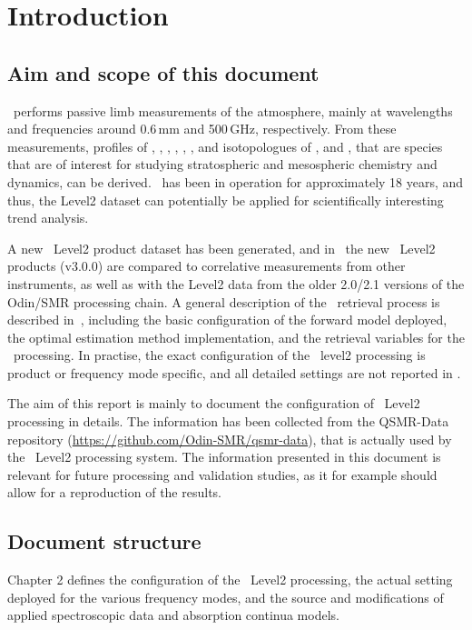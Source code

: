 \chapter{Introduction}
\label{chapter:introduction}


\setcounter{page}{1}


\section{Aim and scope of this document}
\label{sec:aim}
\smr\ performs passive limb measurements of the atmosphere,
mainly at wavelengths and frequencies around 0.6\,mm and 500\,GHz,
respectively.
From these measurements, profiles of 
, , , , 
, , and isotopologues of , and ,
that are species that are of interest for studying stratospheric and 
mesospheric chemistry and dynamics, can be derived. 
\smr\ has been in operation for approximately 18 years, and thus, the Level2
dataset can potentially be applied for scientifically interesting trend analysis.

A new \smr\ Level2 product dataset has been generated, and in~\cite{dds}
the new \smr\ Level2 products (v3.0.0) are compared to correlative measurements from other
instruments, as well as with the Level2 data from the older 2.0/2.1 versions of
the Odin/SMR processing chain. A general description
of the \smr\ retrieval process is described in~\cite{atbdl2}, including 
the basic configuration of the forward
model deployed, the optimal estimation method implementation, and the retrieval
variables for the \smr\ processing. In practise, the exact configuration
of the \smr\ level2 processing is product or frequency mode specific,
and all detailed settings are not reported in \cite{atbdl2}.

The aim of this report is mainly to document the configuration of \smr\ Level2 processing
in details. The information has been collected from the QSMR-Data repository
(\url{https://github.com/Odin-SMR/qsmr-data}), that is actually used
by the \smr\ Level2 processing system. 
The information presented in this document is relevant for future processing and 
validation studies,
as it for example should allow for a reproduction of the results.
 

\section{Document structure}

Chapter 2 defines the configuration of the \smr\ Level2
processing, the actual setting deployed for the various
frequency modes, and the source and modifications of
applied spectroscopic data and absorption continua models.
